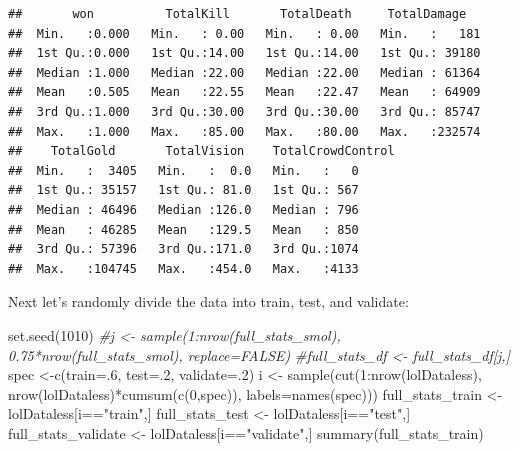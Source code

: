 \documentclass[
]{article}
\newenvironment{Shaded}{\begin{snugshade}}{\end{snugshade}}
\newcommand{\AttributeTok}[1]{\textcolor[rgb]{0.77,0.63,0.00}{#1}}
\newcommand{\CommentTok}[1]{\textcolor[rgb]{0.56,0.35,0.01}{\textit{#1}}}
\newcommand{\DecValTok}[1]{\textcolor[rgb]{0.00,0.00,0.81}{#1}}
\newcommand{\FunctionTok}[1]{\textcolor[rgb]{0.00,0.00,0.00}{#1}}
\newcommand{\NormalTok}[1]{#1}
\newcommand{\OtherTok}[1]{\textcolor[rgb]{0.56,0.35,0.01}{#1}}
\newcommand{\SpecialCharTok}[1]{\textcolor[rgb]{0.00,0.00,0.00}{#1}}
\newcommand{\StringTok}[1]{\textcolor[rgb]{0.31,0.60,0.02}{#1}}
\begin{document}
\begin{verbatim}
##       won          TotalKill       TotalDeath     TotalDamage    
##  Min.   :0.000   Min.   : 0.00   Min.   : 0.00   Min.   :   181  
##  1st Qu.:0.000   1st Qu.:14.00   1st Qu.:14.00   1st Qu.: 39180  
##  Median :1.000   Median :22.00   Median :22.00   Median : 61364  
##  Mean   :0.505   Mean   :22.55   Mean   :22.47   Mean   : 64909  
##  3rd Qu.:1.000   3rd Qu.:30.00   3rd Qu.:30.00   3rd Qu.: 85747  
##  Max.   :1.000   Max.   :85.00   Max.   :80.00   Max.   :232574  
##    TotalGold       TotalVision    TotalCrowdControl
##  Min.   :  3405   Min.   :  0.0   Min.   :   0     
##  1st Qu.: 35157   1st Qu.: 81.0   1st Qu.: 567     
##  Median : 46496   Median :126.0   Median : 796     
##  Mean   : 46285   Mean   :129.5   Mean   : 850     
##  3rd Qu.: 57396   3rd Qu.:171.0   3rd Qu.:1074     
##  Max.   :104745   Max.   :454.0   Max.   :4133
\end{verbatim}

Next let's randomly divide the data into train, test, and validate:

\begin{Shaded}
\begin{Highlighting}[]
\FunctionTok{set.seed}\NormalTok{(}\DecValTok{1010}\NormalTok{)}
\CommentTok{\#j \textless{}{-} sample(1:nrow(full\_stats\_smol), 0.75*nrow(full\_stats\_smol), replace=FALSE)}
\CommentTok{\#full\_stats\_df \textless{}{-} full\_stats\_df[j,]}
\NormalTok{spec }\OtherTok{\textless{}{-}}\FunctionTok{c}\NormalTok{(}\AttributeTok{train=}\NormalTok{.}\DecValTok{6}\NormalTok{, }\AttributeTok{test=}\NormalTok{.}\DecValTok{2}\NormalTok{, }\AttributeTok{validate=}\NormalTok{.}\DecValTok{2}\NormalTok{)}
\NormalTok{i }\OtherTok{\textless{}{-}} \FunctionTok{sample}\NormalTok{(}\FunctionTok{cut}\NormalTok{(}\DecValTok{1}\SpecialCharTok{:}\FunctionTok{nrow}\NormalTok{(lolDataless), }\FunctionTok{nrow}\NormalTok{(lolDataless)}\SpecialCharTok{*}\FunctionTok{cumsum}\NormalTok{(}\FunctionTok{c}\NormalTok{(}\DecValTok{0}\NormalTok{,spec)), }\AttributeTok{labels=}\FunctionTok{names}\NormalTok{(spec)))}
\NormalTok{full\_stats\_train }\OtherTok{\textless{}{-}}\NormalTok{ lolDataless[i}\SpecialCharTok{==}\StringTok{"train"}\NormalTok{,]}
\NormalTok{full\_stats\_test }\OtherTok{\textless{}{-}}\NormalTok{ lolDataless[i}\SpecialCharTok{==}\StringTok{"test"}\NormalTok{,]}
\NormalTok{full\_stats\_validate }\OtherTok{\textless{}{-}}\NormalTok{ lolDataless[i}\SpecialCharTok{==}\StringTok{"validate"}\NormalTok{,]}
\FunctionTok{summary}\NormalTok{(full\_stats\_train)}
\end{Highlighting}
\end{Shaded}
\end{document}
